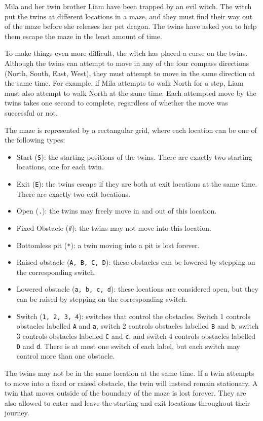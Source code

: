 
Mila and her twin brother Liam have been trapped by an evil witch.  The
witch put the twins at different locations in a maze, and they must
find their way out of the maze before she releases her pet dragon.
The twins have asked you to help them escape the maze in the least
amount of time.

To make things even more difficult, the witch has placed a curse on
the twins.  Although the twins can attempt to move in any of the four
compass directions (North, South, East, West), they must attempt to
move in the same direction at the same time.  For example, if Mila
attempts to walk North for a step, Liam must also attempt to walk
North at the same time.  Each attempted move by the twins takes one
second to complete, regardless of whether the move was successful or
not.

The maze is represented by a rectangular grid, where each location can be one
of the following types:
\begin{itemize}
\item Start (\verb|S|): the starting positions of the
  twins.  There are exactly two starting locations, one for each twin.
\item Exit (\verb|E|): the twins escape if they are both at exit locations
  at the same time.  There are exactly two exit locations.
\item Open (\verb|.|): the twins may freely move in and out of
  this location.
\item Fixed Obstacle (\verb|#|): the twins may not move into this location.
\item Bottomless pit (\verb|*|): a twin moving into a pit is lost forever.
\item Raised obstacle (\verb|A, B, C, D|): these obstacles can be
  lowered by stepping on the corresponding switch.
\item Lowered obstacle (\verb|a, b, c, d|): these locations are considered
  open, but they can be raised by stepping on the corresponding switch.
\item Switch (\verb|1, 2, 3, 4|): switches that control the obstacles.
  Switch 1 controls obstacles labelled \verb|A| and \verb|a|, switch 2
  controls obstacles labelled \verb|B| and \verb|b|, switch 3 controls
  obstacles labelled \verb|C| and \verb|c|, and switch 4 controls
  obstacles labelled \verb|D| and \verb|d|.  There is at most one
  switch of each label, but each switch may control more than one
  obstacle.
\end{itemize}
The twins may not be in the same location at the same time.  If a twin
attempts to move into a fixed or raised obstacle, the twin will instead
remain stationary.  A twin that moves outside of the boundary of the
maze is lost forever.  They are also allowed to enter and leave the
starting and exit locations throughout their journey.

